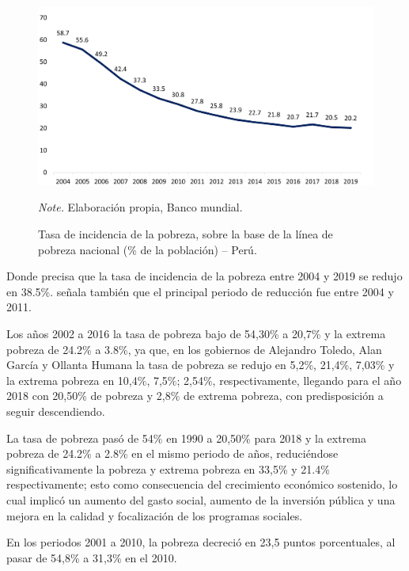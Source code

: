 \begin{figure}[H]
    \caption{Tasa de incidencia de la pobreza, sobre la base de la línea de pobreza nacional (\% de la población) – Perú.}
    \includegraphics[scale=0.8]{Images/Ch_1_Planteamiento_problema/Imagen1.jpg}
    \label{fig:Figure1}  
    
     \begin{tablenotes}
     {\small
         \textit{Note.} Elaboración propia, Banco mundial.
     }
     \end{tablenotes}
\end{figure}

Donde precisa que la tasa de incidencia de la pobreza entre 2004 y 2019 se redujo en 38.5\%. señala también que el principal periodo de reducción fue entre 2004 y 2011. 

Los años 2002 a 2016 la tasa de pobreza bajo de 54,30\% a 20,7\% y la extrema pobreza de 24.2\% a 3.8\%, ya que, en los gobiernos de Alejandro Toledo, Alan García y Ollanta Humana la tasa de pobreza se redujo en 5,2\%, 21,4\%, 7,03\% y la extrema pobreza en 10,4\%, 7,5\%; 2,54\%, respectivamente, llegando para el año 2018 con 20,50\% de pobreza y 2,8\% de extrema pobreza, con predisposición a seguir descendiendo. 

La tasa de pobreza pasó de 54\% en 1990 a 20,50\% para 2018 y la extrema pobreza de 24.2\% a 2.8\% en el mismo periodo de años, reduciéndose significativamente la pobreza y extrema pobreza en 33,5\% y 21.4\% respectivamente; esto como consecuencia del crecimiento económico sostenido, lo cual implicó un aumento del gasto social, aumento de la inversión pública y una mejora en la calidad y focalización de los programas sociales.

En los periodos 2001 a 2010, la pobreza decreció en 23,5 puntos porcentuales, al pasar de 54,8\% a 31,3\% en el 2010.

